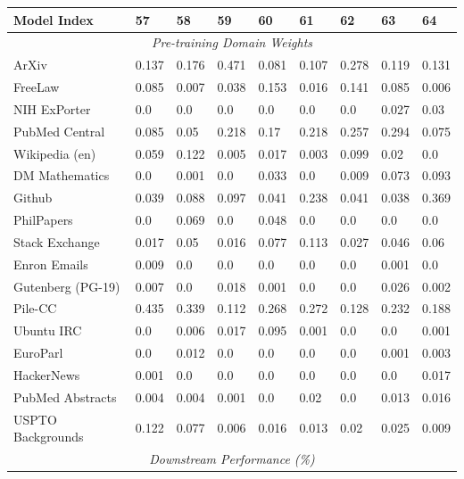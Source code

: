 \begin{table}[!ht]
    \centering
    \begin{tabular}{lllllllll}
    \toprule
        \textbf{Model Index} & \textbf{57} & \textbf{58} & \textbf{59} & \textbf{60} & \textbf{61} & \textbf{62} & \textbf{63} & \textbf{64} \\ \midrule
        \multicolumn{9}{c}{\textit{Pre-training Domain Weights}} \\
        ArXiv & 0.137 & 0.176 & 0.471 & 0.081 & 0.107 & 0.278 & 0.119 & 0.131 \\ 
        FreeLaw & 0.085 & 0.007 & 0.038 & 0.153 & 0.016 & 0.141 & 0.085 & 0.006 \\ 
        NIH ExPorter & 0.0 & 0.0 & 0.0 & 0.0 & 0.0 & 0.0 & 0.027 & 0.03 \\ 
        PubMed Central & 0.085 & 0.05 & 0.218 & 0.17 & 0.218 & 0.257 & 0.294 & 0.075 \\ 
        Wikipedia (en) & 0.059 & 0.122 & 0.005 & 0.017 & 0.003 & 0.099 & 0.02 & 0.0 \\ 
        DM Mathematics & 0.0 & 0.001 & 0.0 & 0.033 & 0.0 & 0.009 & 0.073 & 0.093 \\ 
        Github & 0.039 & 0.088 & 0.097 & 0.041 & 0.238 & 0.041 & 0.038 & 0.369 \\ 
        PhilPapers & 0.0 & 0.069 & 0.0 & 0.048 & 0.0 & 0.0 & 0.0 & 0.0 \\ 
        Stack Exchange & 0.017 & 0.05 & 0.016 & 0.077 & 0.113 & 0.027 & 0.046 & 0.06 \\ 
        Enron Emails & 0.009 & 0.0 & 0.0 & 0.0 & 0.0 & 0.0 & 0.001 & 0.0 \\ 
        Gutenberg (PG-19) & 0.007 & 0.0 & 0.018 & 0.001 & 0.0 & 0.0 & 0.026 & 0.002 \\ 
        Pile-CC & 0.435 & 0.339 & 0.112 & 0.268 & 0.272 & 0.128 & 0.232 & 0.188 \\ 
        Ubuntu IRC & 0.0 & 0.006 & 0.017 & 0.095 & 0.001 & 0.0 & 0.0 & 0.001 \\ 
        EuroParl & 0.0 & 0.012 & 0.0 & 0.0 & 0.0 & 0.0 & 0.001 & 0.003 \\ 
        HackerNews & 0.001 & 0.0 & 0.0 & 0.0 & 0.0 & 0.0 & 0.0 & 0.017 \\ 
        PubMed Abstracts & 0.004 & 0.004 & 0.001 & 0.0 & 0.02 & 0.0 & 0.013 & 0.016 \\ 
        USPTO Backgrounds & 0.122 & 0.077 & 0.006 & 0.016 & 0.013 & 0.02 & 0.025 & 0.009 \\ 
        \midrule
        \multicolumn{9}{c}{\textit{Downstream Performance (\%)}} \\

\end{tabular}
\end{table}

